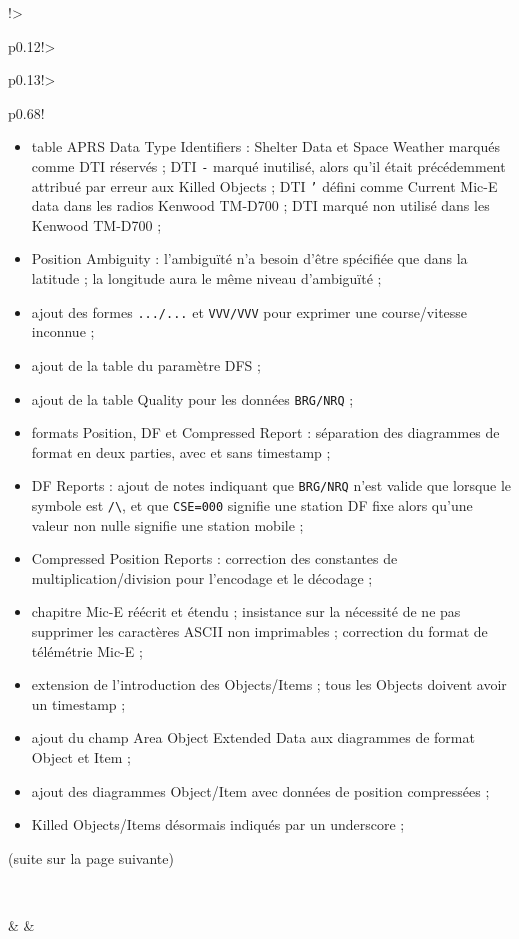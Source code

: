{\begin{longtable}{!{\vrule}>{\raggedright\arraybackslash}p{0.12\linewidth}!{\vrule}>{\raggedright\arraybackslash}p{0.13\linewidth}!{\vrule}>{\raggedright\arraybackslash}p{0.68\linewidth}!{\vrule}}
\begin{minipage}[t]{\linewidth}
\begin{itemize}
\item table APRS Data Type Identifiers : Shelter Data et Space Weather marqués comme DTI réservés ; DTI \texttt{-} marqué inutilisé, alors qu'il était précédemment attribué par erreur aux Killed Objects ; DTI \texttt{'} défini comme Current Mic-E data dans les radios Kenwood TM-D700 ; DTI    \texttt{\textasciigrave{}} marqué non utilisé dans les Kenwood TM-D700 ; 
\item Position Ambiguity : l'ambiguïté n'a besoin d'être spécifiée que dans la latitude ; la longitude aura le même niveau d'ambiguïté ; 
\item ajout des formes \texttt{.../...} et \texttt{VVV/VVV} pour exprimer une course/vitesse inconnue ; 
\item ajout de la table du paramètre DFS ; 
\item ajout de la table Quality pour les données \texttt{BRG/NRQ} ; 
\item formats Position, DF et Compressed Report : séparation des diagrammes de format en deux parties, avec et sans timestamp ; 
\item DF Reports : ajout de notes indiquant que \texttt{BRG/NRQ} n'est valide que lorsque le symbole est \texttt{/\textbackslash{}}, et que \texttt{CSE=000} signifie une station DF fixe alors qu'une valeur non nulle signifie une station mobile ; 
\item Compressed Position Reports : correction des constantes de multiplication/division pour l'encodage et le décodage ; 
\item chapitre Mic-E réécrit et étendu ; insistance sur la nécessité de ne pas supprimer les caractères ASCII non imprimables ; correction du format de télémétrie Mic-E ; 
\item extension de l'introduction des Objects/Items ; tous les Objects doivent avoir un timestamp ; 
\item ajout du champ Area Object Extended Data aux diagrammes de format Object et Item ; 
\item ajout des diagrammes Object/Item avec données de position compressées ; 
\item Killed Objects/Items désormais indiqués par un underscore ;
\end{itemize}
\vspace{0.8ex}
\par{\scriptsize (suite sur la page suivante)}
\end{minipage}
\\
\rule{0pt}{1.6ex} & & \\

\end{longtable}}
